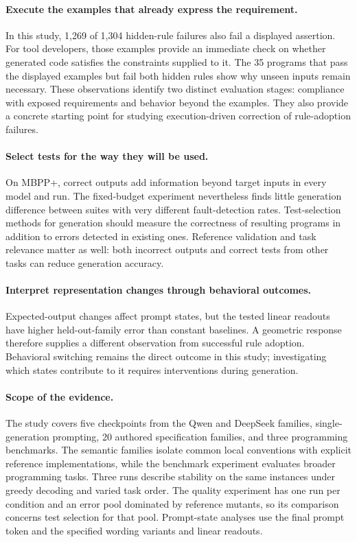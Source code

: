 \documentclass[acmsmall,screen,review,anonymous]{acmart}
\begin{document}
\paragraph{Execute the examples that already express the requirement.}
In this study, 1,269 of 1,304 hidden-rule failures also fail a displayed assertion.
For tool developers, those examples provide an immediate check on whether generated code satisfies the constraints supplied to it.
The 35 programs that pass the displayed examples but fail both hidden rules show why unseen inputs remain necessary.
These observations identify two distinct evaluation stages: compliance with exposed requirements and behavior beyond the examples.
They also provide a concrete starting point for studying execution-driven correction of rule-adoption failures.

\paragraph{Select tests for the way they will be used.}
On MBPP+, correct outputs add information beyond target inputs in every model and run.
The fixed-budget experiment nevertheless finds little generation difference between suites with very different fault-detection rates.
Test-selection methods for generation should measure the correctness of resulting programs in addition to errors detected in existing ones.
Reference validation and task relevance matter as well: both incorrect outputs and correct tests from other tasks can reduce generation accuracy.

\paragraph{Interpret representation changes through behavioral outcomes.}
Expected-output changes affect prompt states, but the tested linear readouts have higher held-out-family error than constant baselines.
A geometric response therefore supplies a different observation from successful rule adoption.
Behavioral switching remains the direct outcome in this study; investigating which states contribute to it requires interventions during generation.

\paragraph{Scope of the evidence.}
The study covers five checkpoints from the Qwen and DeepSeek families, single-generation prompting, 20 authored specification families, and three programming benchmarks.
The semantic families isolate common local conventions with explicit reference implementations, while the benchmark experiment evaluates broader programming tasks.
Three runs describe stability on the same instances under greedy decoding and varied task order.
The quality experiment has one run per condition and an error pool dominated by reference mutants, so its comparison concerns test selection for that pool.
Prompt-state analyses use the final prompt token and the specified wording variants and linear readouts.
\end{document}

